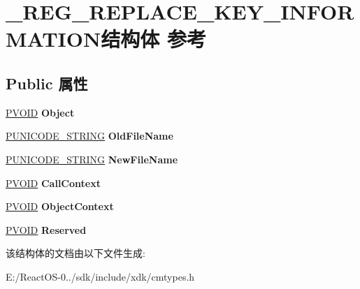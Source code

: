 \hypertarget{struct___r_e_g___r_e_p_l_a_c_e___k_e_y___i_n_f_o_r_m_a_t_i_o_n}{}\section{\+\_\+\+R\+E\+G\+\_\+\+R\+E\+P\+L\+A\+C\+E\+\_\+\+K\+E\+Y\+\_\+\+I\+N\+F\+O\+R\+M\+A\+T\+I\+O\+N结构体 参考}
\label{struct___r_e_g___r_e_p_l_a_c_e___k_e_y___i_n_f_o_r_m_a_t_i_o_n}
\subsection*{Public 属性}
\begin{DoxyCompactItemize}
\item 
\mbox{\label{struct___r_e_g___r_e_p_l_a_c_e___k_e_y___i_n_f_o_r_m_a_t_i_o_n_a136f9d24c54f21bfc08f7252c167dce4}} 
\hyperlink{interfacevoid}{P\+V\+O\+ID} {\bfseries Object}
\item 
\mbox{\label{struct___r_e_g___r_e_p_l_a_c_e___k_e_y___i_n_f_o_r_m_a_t_i_o_n_ace1a634c5ffa8c668f2c88222063064d}} 
\hyperlink{struct___u_n_i_c_o_d_e___s_t_r_i_n_g}{P\+U\+N\+I\+C\+O\+D\+E\+\_\+\+S\+T\+R\+I\+NG} {\bfseries Old\+File\+Name}
\item 
\mbox{\label{struct___r_e_g___r_e_p_l_a_c_e___k_e_y___i_n_f_o_r_m_a_t_i_o_n_a4523c2a667570adfafad0532a4732e50}} 
\hyperlink{struct___u_n_i_c_o_d_e___s_t_r_i_n_g}{P\+U\+N\+I\+C\+O\+D\+E\+\_\+\+S\+T\+R\+I\+NG} {\bfseries New\+File\+Name}
\item 
\mbox{\label{struct___r_e_g___r_e_p_l_a_c_e___k_e_y___i_n_f_o_r_m_a_t_i_o_n_aff0bb38747fc9feffbc01823ab3f0331}} 
\hyperlink{interfacevoid}{P\+V\+O\+ID} {\bfseries Call\+Context}
\item 
\mbox{\label{struct___r_e_g___r_e_p_l_a_c_e___k_e_y___i_n_f_o_r_m_a_t_i_o_n_a8a876370c6d33b365abdfab438250064}} 
\hyperlink{interfacevoid}{P\+V\+O\+ID} {\bfseries Object\+Context}
\item 
\mbox{\label{struct___r_e_g___r_e_p_l_a_c_e___k_e_y___i_n_f_o_r_m_a_t_i_o_n_a66888f24e1d2e57d98417ebf772cade1}} 
\hyperlink{interfacevoid}{P\+V\+O\+ID} {\bfseries Reserved}
\end{DoxyCompactItemize}


该结构体的文档由以下文件生成\+:\begin{DoxyCompactItemize}
\item 
E\+:/\+React\+O\+S-\/0../sdk/include/xdk/cmtypes.\+h\end{DoxyCompactItemize}
